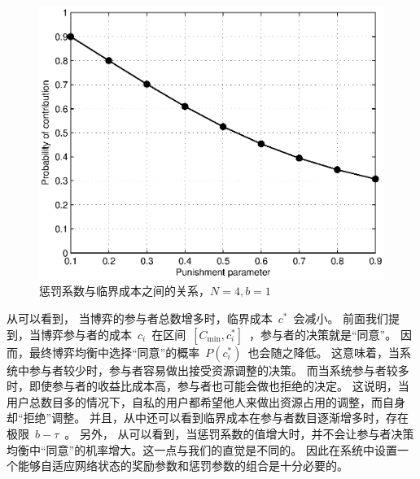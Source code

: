 \begin{figure}[tb]
\begin{centering}
\includegraphics[scale=0.7]{bayesian_uniform_punish_parameter_vs_contribute_probability.eps}
\caption{惩罚系数与临界成本之间的关系，$N=4, b=1$}
\label{fig:bayesian_puni_para_vs_cont_prob}
\end{centering}
\end{figure}
从可以看到，
当博弈的参与者总数增多时，临界成本~$c^*$~会减小。
前面我们提到，当博弈参与者的成本~$c_i$~在区间~$ [C_{\min}, c_i^*] $~，参与者的决策就是“同意”。
因而，最终博弈均衡中选择“同意”的概率~$P(c_i^*)$~也会随之降低。
这意味着，当系统中参与者较少时，参与者容易做出接受资源调整的决策。
而当系统参与者较多时，即使参与者的收益比成本高，参与者也可能会做也拒绝的决定。
这说明，当用户总数目多的情况下，自私的用户都希望他人来做出资源占用的调整，而自身却“拒绝”调整。
并且，从中还可以看到临界成本在参与者数目逐渐增多时，存在极限~$b-\tau$~。
另外，
从可以看到，当惩罚系数的值增大时，并不会让参与者决策均衡中“同意”的机率增大。这一点与我们的直觉是不同的。
因此在系统中设置一个能够自适应网络状态的奖励参数和惩罚参数的组合是十分必要的。

